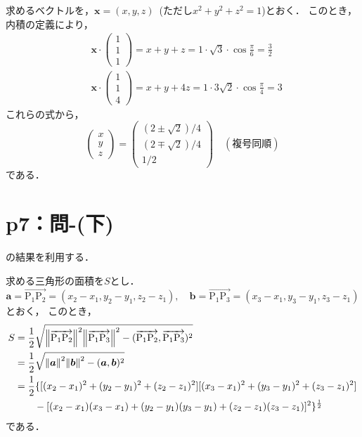\documentclass[a4paper,10pt,fleqn]{ltjsarticle}
\begin{document}
\begin{tleftbar}
  求めるベクトルを，$\bm{x}=(x,y,z)$~(ただし$x^2+y^2 +z^2=1$)とおく．
  このとき，内積の定義により，
  \begin{align*}
     & \bm{x} \cdot
    \begin{pmatrix}
      1 \\
      1 \\
      1
    \end{pmatrix}
    =x+y+z= 1 \cdot \sqrt{3} \cdot \cos \frac{\pi}{6} =\frac{3}{2} \\
     & \bm{x} \cdot
    \begin{pmatrix}
      1 \\
      1 \\
      4
    \end{pmatrix}
    =x+y+4z= 1 \cdot 3\sqrt{2} \cdot \cos \frac{\pi}{4} =3
  \end{align*}
  これらの式から，
  \begin{equation*}
    \begin{pmatrix}
      x \\
      y \\
      z
    \end{pmatrix}
    =
    \begin{pmatrix}
      (2 \pm \sqrt{2})/4 \\
      (2 \mp \sqrt{2})/4 \\
      1/2
    \end{pmatrix}
    \quad (\text{複号同順})
  \end{equation*}
  である．
\end{tleftbar}
\section*{p7：問-(下)}
\begin{tleftbar}
  [1.4]の結果を利用する．

  求める三角形の面積を$S$とし．
  \[
    \bm{a}=\overrightarrow{\mathrm{P_1 P_2}}=(x_2-x_1,y_2-y_1,z_2-z_1),\quad \bm{b}=\overrightarrow{\mathrm{P_1 P_3}}=(x_3-x_1,y_3-y_1,z_3-z_1)
  \]
  とおく，
  このとき，
  \begin{align*}
    S & = \frac{1}{2} \sqrt{\norm{\overrightarrow{\mathrm{P_1 P_2}}}^2 \norm{\overrightarrow{\mathrm{P_1 P_3}}}^2 - (\overrightarrow{\mathrm{P_1 P_2}}, \overrightarrow{\mathrm{P_1 P_3}})^2} \\
      & = \frac{1}{2} \sqrt{\norm{\bm{a}}^2 \norm{\bm{b}}^2 - (\bm{a},\bm{b})^2 }                                                                                                             \\
      & = \frac{1}{2} \{ \lbrack (x_2 - x_1)^2+(y_2-y_1)^2+ (z_2 - z_1)^2 \rbrack \lbrack (x_3 - x_1)^2+(y_3-y_1)^2+ (z_3 - z_1)^2 \rbrack                                                    \\
      & \qquad - \lbrack (x_2-x_1)(x_3-x_1)+(y_2 -y_1)(y_3-y_1)+(z_2-z_1)(z_3-z_1)\rbrack ^2\}^{\frac{1}{2}}
  \end{align*}
  である．
\end{tleftbar}
\end{document}
